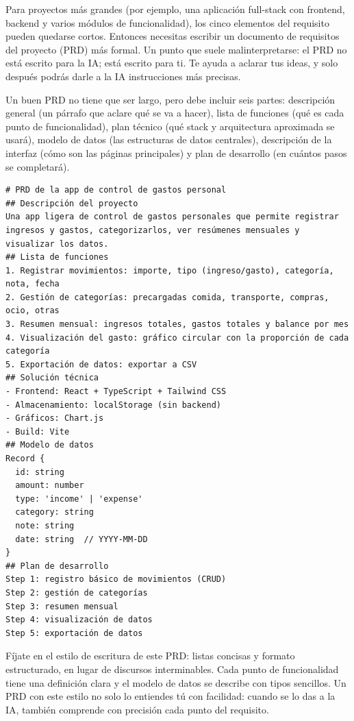 Para proyectos más grandes (por ejemplo, una aplicación full-stack con frontend, backend y varios módulos de funcionalidad), los cinco elementos del requisito pueden quedarse cortos. Entonces necesitas escribir un documento de requisitos del proyecto (PRD) más formal. Un punto que suele malinterpretarse: el PRD no está escrito para la IA; está escrito para ti. Te ayuda a aclarar tus ideas, y solo después podrás darle a la IA instrucciones más precisas.

Un buen PRD no tiene que ser largo, pero debe incluir seis partes: descripción general (un párrafo que aclare qué se va a hacer), lista de funciones (qué es cada punto de funcionalidad), plan técnico (qué stack y arquitectura aproximada se usará), modelo de datos (las estructuras de datos centrales), descripción de la interfaz (cómo son las páginas principales) y plan de desarrollo (en cuántos pasos se completará).

\begin{lstlisting}
# PRD de la app de control de gastos personal
## Descripción del proyecto
Una app ligera de control de gastos personales que permite registrar ingresos y gastos, categorizarlos, ver resúmenes mensuales y visualizar los datos.
## Lista de funciones
1. Registrar movimientos: importe, tipo (ingreso/gasto), categoría, nota, fecha
2. Gestión de categorías: precargadas comida, transporte, compras, ocio, otras
3. Resumen mensual: ingresos totales, gastos totales y balance por mes
4. Visualización del gasto: gráfico circular con la proporción de cada categoría
5. Exportación de datos: exportar a CSV
## Solución técnica
- Frontend: React + TypeScript + Tailwind CSS
- Almacenamiento: localStorage (sin backend)
- Gráficos: Chart.js
- Build: Vite
## Modelo de datos
Record {
  id: string
  amount: number
  type: 'income' | 'expense'
  category: string
  note: string
  date: string  // YYYY-MM-DD
}
## Plan de desarrollo
Step 1: registro básico de movimientos (CRUD)
Step 2: gestión de categorías
Step 3: resumen mensual
Step 4: visualización de datos
Step 5: exportación de datos
\end{lstlisting}

Fíjate en el estilo de escritura de este PRD: listas concisas y formato estructurado, en lugar de discursos interminables. Cada punto de funcionalidad tiene una definición clara y el modelo de datos se describe con tipos sencillos. Un PRD con este estilo no solo lo entiendes tú con facilidad: cuando se lo das a la IA, también comprende con precisión cada punto del requisito.

